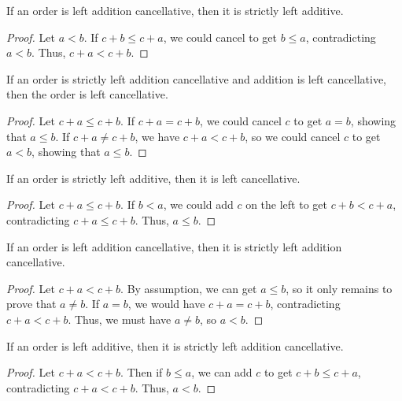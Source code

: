 \documentclass[../../math.tex]{subfiles}
\begin{document}
\begin{instance} \label{lt_lplus2}
    If an order is left addition cancellative, then it is strictly left
    additive.
\end{instance}
\begin{proof}
    Let $a < b$.  If $c + b \leq c + a$, we could cancel to get $b \leq a$,
    contradicting $a < b$.  Thus, $c + a < c + b$.
\end{proof}

\begin{instance} \label{le_plus_lcancel1}
    If an order is strictly left addition cancellative and addition is left
    cancellative, then the order is left cancellative.
\end{instance}
\begin{proof}
    Let $c + a \leq c + b$.  If $c + a = c + b$, we could cancel $c$ to get $a =
    b$, showing that $a \leq b$.  If $c + a \neq c + b$, we have $c + a < c +
    b$, so we could cancel $c$ to get $a < b$, showing that $a \leq b$.
\end{proof}

\begin{instance} \label{le_plus_lcancel2}
    If an order is strictly left additive, then it is left cancellative.
\end{instance}
\begin{proof}
    Let $c + a \leq c + b$.  If $b < a$, we could add $c$ on the left to get $c
    + b < c + a$, contradicting $c + a \leq c + b$.  Thus, $a \leq b$.
\end{proof}

\begin{instance} \label{lt_plus_lcancel1}
    If an order is left addition cancellative, then it is strictly left addition
    cancellative.
\end{instance}
\begin{proof}
    Let $c + a < c + b$.  By assumption, we can get $a \leq b$, so it only
    remains to prove that $a \neq b$.  If $a = b$, we would have $c + a = c +
    b$, contradicting $c + a < c + b$.  Thus, we must have $a \neq b$, so $a <
    b$.
\end{proof}

\begin{instance} \label{lt_plus_lcancel2}
    If an order is left additive, then it is strictly left addition
    cancellative.
\end{instance}
\begin{proof}
    Let $c + a < c + b$.  Then if $b \leq a$, we can add $c$ to get $c + b \leq
    c + a$, contradicting $c + a < c + b$.  Thus, $a < b$.
\end{proof}
\end{document}
